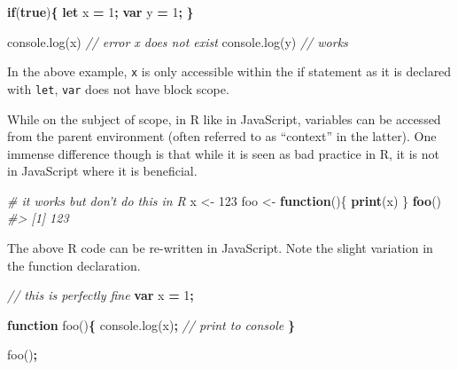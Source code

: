 \documentclass[10pt,]{krantz}
\makeatletter
\newenvironment{Shaded}{\begin{snugshade}}{\end{snugshade}}
\newcommand{\AttributeTok}[1]{\textcolor[rgb]{0.61,0.61,0.61}{#1}}
\newcommand{\CommentTok}[1]{\textcolor[rgb]{0.37,0.37,0.37}{\textit{#1}}}
\newcommand{\ControlFlowTok}[1]{\textcolor[rgb]{0.27,0.27,0.27}{\textbf{#1}}}
\newcommand{\DecValTok}[1]{\textcolor[rgb]{0.06,0.06,0.06}{#1}}
\newcommand{\KeywordTok}[1]{\textcolor[rgb]{0.27,0.27,0.27}{\textbf{#1}}}
\newcommand{\NormalTok}[1]{#1}
\newcommand{\OperatorTok}[1]{\textcolor[rgb]{0.43,0.43,0.43}{\textbf{#1}}}
\newcommand{\StringTok}[1]{\textcolor[rgb]{0.5,0.5,0.5}{#1}}
\newcommand{\VariableTok}[1]{\textcolor[rgb]{0,0,0}{#1}}
\newenvironment{kframe}{%
\medskip{}
\setlength{\fboxsep}{.8em}
 \def\at@end@of@kframe{}%
 \ifinner\ifhmode%
  \def\at@end@of@kframe{\end{minipage}}%
  \begin{minipage}{\columnwidth}%
 \fi\fi%
 \def\FrameCommand##1{\hskip\@totalleftmargin \hskip-\fboxsep
 \colorbox{shadecolor}{##1}\hskip-\fboxsep
     \hskip-\linewidth \hskip-\@totalleftmargin \hskip\columnwidth}%
 \MakeFramed {\advance\hsize-\width
   \@totalleftmargin\z@ \linewidth\hsize
   \@setminipage}}%
 {\par\unskip\endMakeFramed%
 \at@end@of@kframe}
\renewenvironment{Shaded}{\begin{kframe}}{\end{kframe}}
\makeatother
\begin{document}
\begin{Shaded}
\begin{Highlighting}[]
\ControlFlowTok{if}\NormalTok{(}\KeywordTok{true}\NormalTok{)}\OperatorTok{\{}
  \KeywordTok{let}\NormalTok{ x }\OperatorTok{=} \DecValTok{1}\OperatorTok{;}
  \KeywordTok{var}\NormalTok{ y }\OperatorTok{=} \DecValTok{1}\OperatorTok{;}
\OperatorTok{\}}

\VariableTok{console}\NormalTok{.}\AttributeTok{log}\NormalTok{(x) }\CommentTok{// error x does not exist}
\VariableTok{console}\NormalTok{.}\AttributeTok{log}\NormalTok{(y) }\CommentTok{// works}
\end{Highlighting}
\end{Shaded}

In the above example, \texttt{x} is only accessible within the if statement as it is declared with \texttt{let}, \texttt{var} does not have block scope.

While on the subject of scope, in R like in JavaScript, variables can be accessed from the parent environment (often referred to as ``context'' in the latter). One immense difference though is that while it is seen as bad practice in R, it is not in JavaScript where it is beneficial.

\begin{Shaded}
\begin{Highlighting}[]
\CommentTok{# it works but don't do this in R}
\NormalTok{x <-}\StringTok{ }\DecValTok{123}
\NormalTok{foo <-}\StringTok{ }\ControlFlowTok{function}\NormalTok{()\{}
  \KeywordTok{print}\NormalTok{(x)}
\NormalTok{\}}
\KeywordTok{foo}\NormalTok{()}
\CommentTok{#> [1] 123}
\end{Highlighting}
\end{Shaded}

The above R code can be re-written in JavaScript. Note the slight variation in the function declaration.

\begin{Shaded}
\begin{Highlighting}[]
\CommentTok{// this is perfectly fine}
\KeywordTok{var}\NormalTok{ x }\OperatorTok{=} \DecValTok{1}\OperatorTok{;}

\KeywordTok{function} \AttributeTok{foo}\NormalTok{()}\OperatorTok{\{}
  \VariableTok{console}\NormalTok{.}\AttributeTok{log}\NormalTok{(x)}\OperatorTok{;} \CommentTok{// print to console}
\OperatorTok{\}}

\AttributeTok{foo}\NormalTok{()}\OperatorTok{;}
\end{Highlighting}
\end{Shaded}
\end{document}
